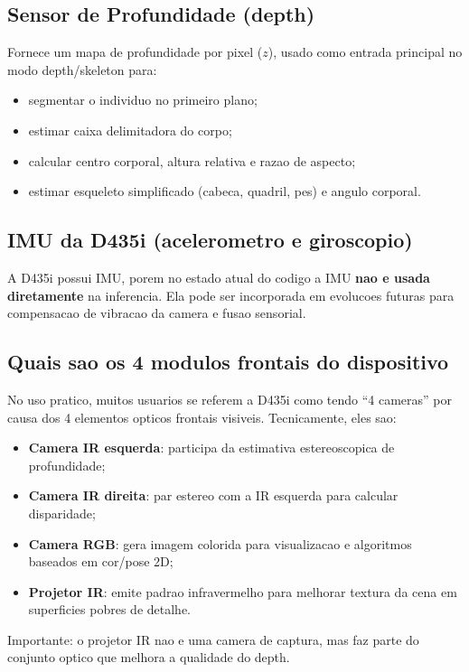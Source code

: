 \documentclass[12pt,a4paper]{article}
\begin{document}
\subsection{Sensor de Profundidade (depth)}
Fornece um mapa de profundidade por pixel ($z$), usado como entrada principal no modo depth/skeleton para:
\begin{itemize}
    \item segmentar o individuo no primeiro plano;
    \item estimar caixa delimitadora do corpo;
    \item calcular centro corporal, altura relativa e razao de aspecto;
    \item estimar esqueleto simplificado (cabeca, quadril, pes) e angulo corporal.
\end{itemize}

\subsection{IMU da D435i (acelerometro e giroscopio)}
A D435i possui IMU, porem no estado atual do codigo a IMU \textbf{nao e usada diretamente} na inferencia.
Ela pode ser incorporada em evolucoes futuras para compensacao de vibracao da camera e fusao sensorial.

\subsection{Quais sao os 4 modulos frontais do dispositivo}
No uso pratico, muitos usuarios se referem a D435i como tendo ``4 cameras'' por causa dos 4 elementos opticos frontais visiveis.
Tecnicamente, eles sao:
\begin{itemize}
    \item \textbf{Camera IR esquerda}: participa da estimativa estereoscopica de profundidade;
    \item \textbf{Camera IR direita}: par estereo com a IR esquerda para calcular disparidade;
    \item \textbf{Camera RGB}: gera imagem colorida para visualizacao e algoritmos baseados em cor/pose 2D;
    \item \textbf{Projetor IR}: emite padrao infravermelho para melhorar textura da cena em superficies pobres de detalhe.
\end{itemize}

Importante: o projetor IR nao e uma camera de captura, mas faz parte do conjunto optico que melhora a qualidade do depth.
\end{document}
